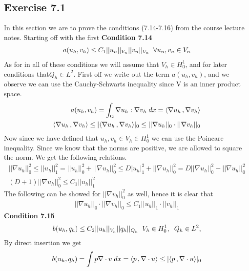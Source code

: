 \documentclass[a4paper,norsk]{article}
\begin{document}
\subsection*{Exercise 7.1}
In this section we are to prove the conditions (7.14-7.16) from the course lecture notes. 
Starting off with the first 
\textbf{Condition 7.14}
\begin{align*}
a(u_h, v_h) \leq C_1 ||u_n||_{V_n} ||v_n||_{V_n} \hspace{2mm} \forall u_n, v_n \in V_n
\end{align*}
As for in all of these conditions we will assume that $V_h \in H_0^1$, and for later conditions that$Q_h \in L^2$.
\newline
First off we write out the term $a(u_h, v_h)$, and we observe we can use the Cauchy-Schwarts inequality since
V is an inner product space. 
\begin{align*}
a(u_h, v_h) = \int_\Omega \nabla u_h : \nabla v_h \hspace{1mm} dx  = \langle \nabla u_h \,, \nabla v_h \rangle \\
\langle \nabla u_h \,, \nabla v_h \rangle \leq |\langle \nabla u_h \,, \nabla v_h \rangle|_0 
\leq ||\nabla u_h||_0 \cdot ||\nabla v_h||_0
\end{align*}
Now since we have defined that $u_h, v_h \in V_h \in H_0^1$ we can use the Poincare inequality. Since we know that the norms 
are positive, we are allowed to square the norm. We get the following relations.
\begin{align*}
||\nabla u_h ||^2_{0} \leq ||u_h||^2_{1} = ||u_h||^2_{0} + ||\nabla u_h||^2_{0} \leq D |u_h|^2_{1} +  ||\nabla u_h||^2_{0} =
D ||\nabla u_h||^2_{0} +  ||\nabla u_h||^2_{0} \\
(D + 1) ||\nabla u_h||^2_{0} \leq C_1 ||u_h||^2_{1} 
\end{align*}
The following can be showed for $||\nabla v_h ||^2_{0}$ as well, hence it is clear that 
\begin{align*}
||\nabla u_h ||_0 \cdot ||\nabla v_h ||_0 \leq C_1 ||u_h||_1 \cdot ||v_h||_1
\end{align*}
\textbf{Condition 7.15}
\begin{align*}
b(u_h, q_h) \leq C_2 ||u_h||_{V_h} ||q_h||_{Q_h} \hspace{2mm}  V_h \in H_0^1, \hspace{2mm} Q_h \in L^2,
\end{align*}
By direct insertion we get 
\begin{align*}
b(u_h, q_h) = \int p \nabla \cdot v \hspace{1mm} dx = \langle p \,, \nabla \cdot u \rangle \leq | \langle p \,, \nabla \cdot u \rangle |_0
\end{align*}
\end{document}
